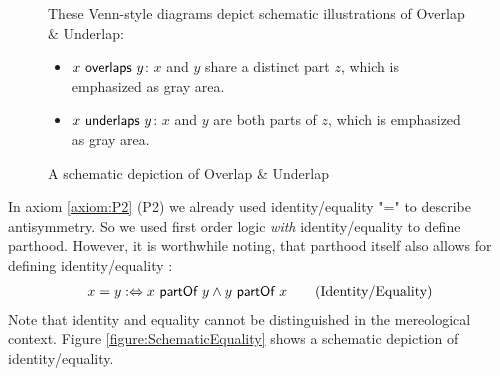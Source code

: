 \begin{figure}[h!]
\begin{center}
\hspace*{5mm}
\end{center}
{
\scriptsize 
These Venn-style diagrams depict schematic illustrations of Overlap \& Underlap:
\begin{itemize}
\item
$x ~\textsf{overlaps}~ y$:
$x$ and $y$ share a distinct part $z$, which is emphasized as gray area.
\item
$x ~\textsf{underlaps}~ y$:
$x$ and $y$ are both parts of $z$, which is emphasized as gray area.
\end{itemize}
}
\caption{A schematic depiction of Overlap \& Underlap}
\label{figure:SchematicOverlapAndUnderlap}
\end{figure}


In axiom \ref{axiom:P2} (P2) we already used identity/equality "=" to describe antisymmetry.
So we used first order logic \emph{with} identity/equality to define parthood.
However, it is worthwhile noting, that parthood itself also allows for defining identity/equality \cite{SEP:Mereology}:
\begin{align}
\label{definition:MereologicalIdentityEquality}
x = y
:\Leftrightarrow
x ~\textsf{partOf}~ y \wedge y ~\textsf{partOf}~ x
\qquad \text{(Identity/Equality)}
\end{align}
Note that identity and equality cannot be distinguished in the mereological context.
Figure \ref{figure:SchematicEquality} shows a schematic depiction of identity/equality.

